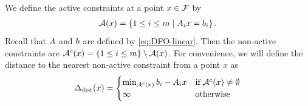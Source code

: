 \documentclass{article}
\begin{document}
We define the active constraints at a point $x \in {\mathcal F}$ by
\begin{align}
{\mathcal A}(x) = \left\{1 \le i \le m \; | \; {{A}}_ix = {{b}}_i \right\}. \label{define_activei}
\end{align}
Recall that ${A}$ and ${b}$ are defined by \cref{eq:DFO-linear}.
Then the non-active constraints are ${\mathcal A}^c(x) = \left\{1 \le i \le m\right\} \setminus {\mathcal A}(x)$.
For convenience, we will define the distance to the nearest non-active constraint from a point $x$ as
\begin{align}
\label{nearestnonactive}
\Delta_{\textrm{dist}}(x) =
\begin{cases}
\min_{{\mathcal A}^c(x)}{b_i - A_i x} & \text{if} \; {\mathcal A}^c(x) \ne \emptyset \\
\infty & \textrm{otherwise}
\end{cases}
\end{align}
\end{document}
